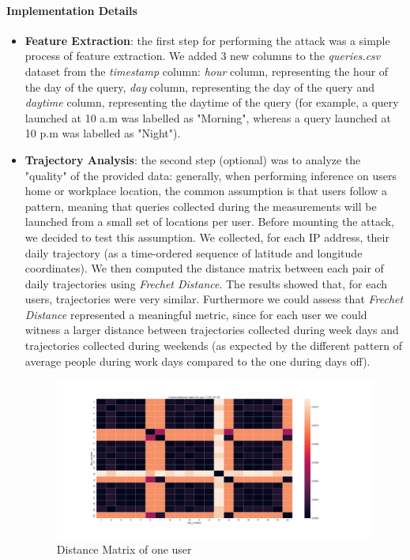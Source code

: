 \documentclass[10pt,conference,compsocconf]{IEEEtran}
\begin{document}
\paragraph{Implementation Details}
\begin{itemize}
    \item \textbf{Feature Extraction}: the first step for performing the attack
    was a simple process of feature extraction. We added 3 new columns to the
    \textit{queries.csv} dataset from the \textit{timestamp} column:
    \textit{hour} column, representing the hour of the day of the query,
    \textit{day} column, representing the day of the query and \textit{daytime}
    column, representing the daytime of the query (for example, a query launched
    at 10 a.m was labelled as "Morning", whereas a query launched at 10 p.m was
    labelled as "Night").
    \item \textbf{Trajectory Analysis}: the second step (optional) was to
    analyze the "quality" of the provided data: generally, when performing
    inference on users home or workplace location, the common assumption is that
    users follow a pattern, meaning that queries collected during the
    measurements will be launched from a small set of locations per user. Before
    mounting the attack, we decided to test this assumption. We collected, for
    each IP address, their daily trajectory (as a time-ordered sequence of
    latitude and longitude coordinates). We then computed the distance matrix
    between each pair of daily trajectories using \textit{Frechet Distance}. The
    results showed that, for each users, trajectories were very similar.
    Furthermore we could assess that \textit{Frechet Distance} represented a
    meaningful metric, since for each user we could witness a larger distance
    between trajectories collected during week days and trajectories collected
    during weekends (as expected by the different pattern of average people
    during work days compared to the one during days off).


    \begin{figure}[h!]
        \centering
        \includegraphics[width=0.9\linewidth]{../privacy_evaluation/daily_trajectories/7.210.121.52-matrix.png}
        \caption{Distance Matrix of one user}
        \label{fig:matrix}
    \end{figure}



\end{itemize}
\end{document}
